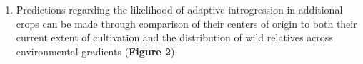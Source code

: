 \documentclass[11pt]{article}
\begin{document}
\begin{enumerate}
\begin{enumerate}















	\end{enumerate}
	\item{Predictions regarding the likelihood of adaptive introgression in additional crops can be made through comparison of their centers of origin to both their current extent of cultivation and the distribution of wild relatives across environmental gradients (\textbf{Figure 2}).}
	
	
	

	
	
	
	
	
	
	
	
\end{enumerate}


\end{document}

